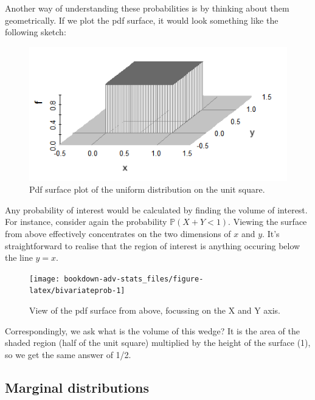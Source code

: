 \documentclass[
]{book}
\newcommand{\bbP}{\mathbb{P}}
\theoremstyle{definition}
\theoremstyle{definition}
\theoremstyle{definition}
\theoremstyle{definition}
\theoremstyle{remark}
\begin{document}
Another way of understanding these probabilities is by thinking about them geometrically.
If we plot the pdf surface, it would look something like the following sketch:

\begin{figure}

{\centering \includegraphics[width=0.8\linewidth]{figure/bivariateunif} 

}

\caption{Pdf surface plot of the uniform distribution on the unit square.}\label{fig:unnamed-chunk-8}
\end{figure}

Any probability of interest would be calculated by finding the volume of interest.
For instance, consider again the probability \(\bbP(X + Y < 1)\).
Viewing the surface from above effectively concentrates on the two dimensions of \(x\) and \(y\).
It's straightforward to realise that the region of interest is anything occuring below the line \(y=x\).

\begin{figure}

{\centering \texttt{[image: bookdown-adv-stats\_files/figure-latex/bivariateprob-1]} 

}

\caption{View of the pdf surface from above, focussing on the X and Y axis.}\label{fig:bivariateprob}
\end{figure}

Correspondingly, we ask what is the volume of this wedge?
It is the area of the shaded region (half of the unit square) multiplied by the height of the surface (1), so we get the same answer of 1/2.

\hypertarget{marginal-distributions}{%
\subsection{Marginal distributions}\label{marginal-distributions}}
\end{document}
